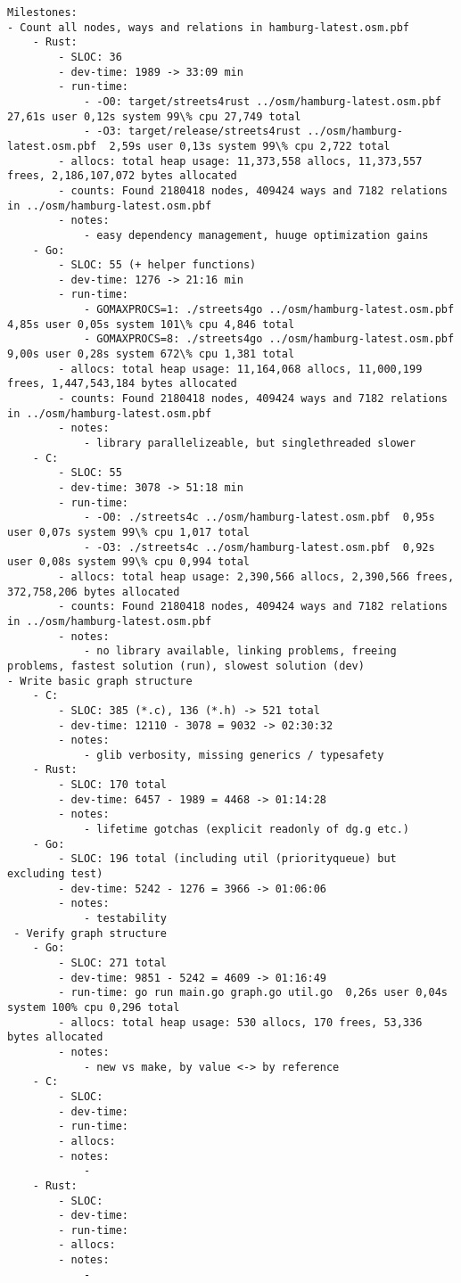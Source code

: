 \begin{verbatim}
Milestones:
- Count all nodes, ways and relations in hamburg-latest.osm.pbf
    - Rust:
        - SLOC: 36
        - dev-time: 1989 -> 33:09 min
        - run-time:
            - -O0: target/streets4rust ../osm/hamburg-latest.osm.pbf  27,61s user 0,12s system 99\% cpu 27,749 total
            - -O3: target/release/streets4rust ../osm/hamburg-latest.osm.pbf  2,59s user 0,13s system 99\% cpu 2,722 total
        - allocs: total heap usage: 11,373,558 allocs, 11,373,557 frees, 2,186,107,072 bytes allocated
        - counts: Found 2180418 nodes, 409424 ways and 7182 relations in ../osm/hamburg-latest.osm.pbf
        - notes:
            - easy dependency management, huuge optimization gains
    - Go:
        - SLOC: 55 (+ helper functions)
        - dev-time: 1276 -> 21:16 min
        - run-time:
            - GOMAXPROCS=1: ./streets4go ../osm/hamburg-latest.osm.pbf  4,85s user 0,05s system 101\% cpu 4,846 total
            - GOMAXPROCS=8: ./streets4go ../osm/hamburg-latest.osm.pbf  9,00s user 0,28s system 672\% cpu 1,381 total
        - allocs: total heap usage: 11,164,068 allocs, 11,000,199 frees, 1,447,543,184 bytes allocated
        - counts: Found 2180418 nodes, 409424 ways and 7182 relations in ../osm/hamburg-latest.osm.pbf
        - notes:
            - library parallelizeable, but singlethreaded slower
    - C:
        - SLOC: 55
        - dev-time: 3078 -> 51:18 min
        - run-time:
            - -O0: ./streets4c ../osm/hamburg-latest.osm.pbf  0,95s user 0,07s system 99\% cpu 1,017 total
            - -O3: ./streets4c ../osm/hamburg-latest.osm.pbf  0,92s user 0,08s system 99\% cpu 0,994 total
        - allocs: total heap usage: 2,390,566 allocs, 2,390,566 frees, 372,758,206 bytes allocated
        - counts: Found 2180418 nodes, 409424 ways and 7182 relations in ../osm/hamburg-latest.osm.pbf
        - notes:
            - no library available, linking problems, freeing problems, fastest solution (run), slowest solution (dev)
- Write basic graph structure
    - C:
        - SLOC: 385 (*.c), 136 (*.h) -> 521 total
        - dev-time: 12110 - 3078 = 9032 -> 02:30:32
        - notes:
            - glib verbosity, missing generics / typesafety
    - Rust:
        - SLOC: 170 total
        - dev-time: 6457 - 1989 = 4468 -> 01:14:28
        - notes:
            - lifetime gotchas (explicit readonly of dg.g etc.)
    - Go:
        - SLOC: 196 total (including util (priorityqueue) but excluding test)
        - dev-time: 5242 - 1276 = 3966 -> 01:06:06
        - notes:
            - testability
 - Verify graph structure
    - Go:
        - SLOC: 271 total
        - dev-time: 9851 - 5242 = 4609 -> 01:16:49
        - run-time: go run main.go graph.go util.go  0,26s user 0,04s system 100% cpu 0,296 total
        - allocs: total heap usage: 530 allocs, 170 frees, 53,336 bytes allocated
        - notes:
            - new vs make, by value <-> by reference
    - C:
        - SLOC:
        - dev-time:
        - run-time:
        - allocs:
        - notes:
            -
    - Rust:
        - SLOC:
        - dev-time:
        - run-time:
        - allocs:
        - notes:
            -
\end{verbatim}
